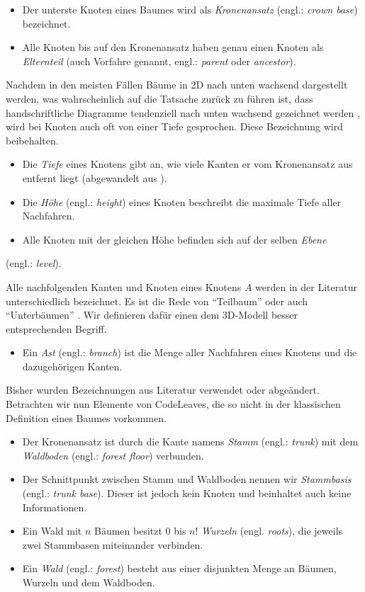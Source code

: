 \begin{itemize}
  \item Der unterste Knoten eines Baumes wird als \textit{Kronenansatz} (engl.: \textit{crown base}) bezeichnet.
  \item Alle Knoten bis auf den Kronenansatz haben genau einen Knoten als \textit{Elternteil} (auch Vorfahre genannt, engl.: \textit{parent} oder \textit{ancestor}).
\end{itemize}

Nachdem in den meisten Fällen Bäume in 2D nach unten wachsend dargestellt werden, was wahrscheinlich auf die Tatsache zurück zu führen ist, dass handschriftliche Diagramme tendenziell nach unten wachsend gezeichnet werden \cite{knuth1973fundamental}, wird bei Knoten auch oft von einer Tiefe gesprochen. Diese Bezeichnung wird beibehalten.

\begin{itemize}
  \item Die \textit{Tiefe} eines Knotens gibt an, wie viele Kanten er vom Kronenansatz aus entfernt liegt (abgewandelt aus \cite{ernst2016grundkurs}).
  \item Die \textit{Höhe} (engl.: \textit{height}) eines Knoten beschreibt die maximale Tiefe aller Nachfahren.
  \item Alle Knoten mit der gleichen Höhe befinden sich auf der selben \textit{Ebene}
\end{itemize} (engl.: \textit{level}).

Alle nachfolgenden Kanten und Knoten eines Knotens $A$ werden in der Literatur unterschiedlich bezeichnet. Es ist die Rede von "`Teilbaum"' \cite{ernst2016grundkurs} oder auch "`Unterbäumen"' \cite{gumm2009einfuehrung}. Wir definieren dafür einen dem 3D-Modell besser entsprechenden Begriff.

\begin{itemize}
  \item Ein \textit{Ast} (engl.: \textit{branch}) ist die Menge aller Nachfahren eines Knotens und die dazugehörigen Kanten.
\end{itemize}

Bisher wurden Bezeichnungen aus Literatur verwendet oder abgeändert. Betrachten wir nun Elemente von CodeLeaves, die so nicht in der klassischen Definition eines Baumes vorkommen.

\begin{itemize}
  \item Der Kronenansatz ist durch die Kante namens \textit{Stamm} (engl.: \textit{trunk}) mit dem \textit{Waldboden} (engl.: \textit{forest floor}) verbunden.
  \item Der Schnittpunkt zwischen Stamm und Waldboden nennen wir \textit{Stammbasis} (engl.: \textit{trunk base}). Dieser ist jedoch kein Knoten und beinhaltet auch keine Informationen.
  \item Ein Wald mit $n$ Bäumen besitzt $0$ bis $n!$ \textit{Wurzeln} (engl. \textit{roots}), die jeweils zwei Stammbasen miteinander verbinden.
  \item Ein \textit{Wald} (engl.: \textit{forest}) besteht aus einer disjunkten Menge an Bäumen, Wurzeln und dem Waldboden.
\end{itemize}

